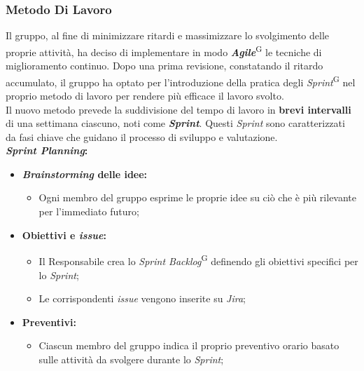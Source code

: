 \documentclass[5pt]{article}
\begin{document}
\subsubsection{Metodo Di Lavoro}
Il gruppo, al fine di minimizzare ritardi e massimizzare lo svolgimento delle proprie attività, ha deciso di implementare in modo \textbf{\textit{Agile}}\textsuperscript{G} le tecniche di miglioramento continuo. Dopo una prima revisione, constatando il ritardo accumulato, il gruppo ha optato per l'introduzione della pratica degli \textit{Sprint}\textsuperscript{G} nel proprio metodo di lavoro per rendere più efficace il lavoro svolto.\\
Il nuovo metodo prevede la suddivisione del tempo di lavoro in \textbf{brevi intervalli} di una settimana ciascuno, noti come \textbf{\textit{Sprint}}. Questi \textit{Sprint} sono caratterizzati da fasi chiave che guidano il processo di sviluppo e valutazione.\\
\textbf{\textit{Sprint Planning}:}
\begin{itemize}
    \item \textbf{\textit{Brainstorming} delle idee:}
    \begin{itemize}
        \item Ogni membro del gruppo esprime le proprie idee su ciò che è più rilevante per l'immediato futuro;
    \end{itemize}
    \item \textbf{Obiettivi e \textit{issue}:}
    \begin{itemize}
        \item Il Responsabile crea lo \textit{Sprint Backlog}\textsuperscript{G} definendo gli obiettivi specifici per lo \textit{Sprint};
        \item Le corrispondenti \textit{issue} vengono inserite su \textit{Jira};
    \end{itemize}
    \item \textbf{Preventivi:}
    \begin{itemize}
        \item Ciascun membro del gruppo indica il proprio preventivo orario basato sulle attività da svolgere durante lo \textit{Sprint};
    \end{itemize}
\end{itemize}
\end{document}
